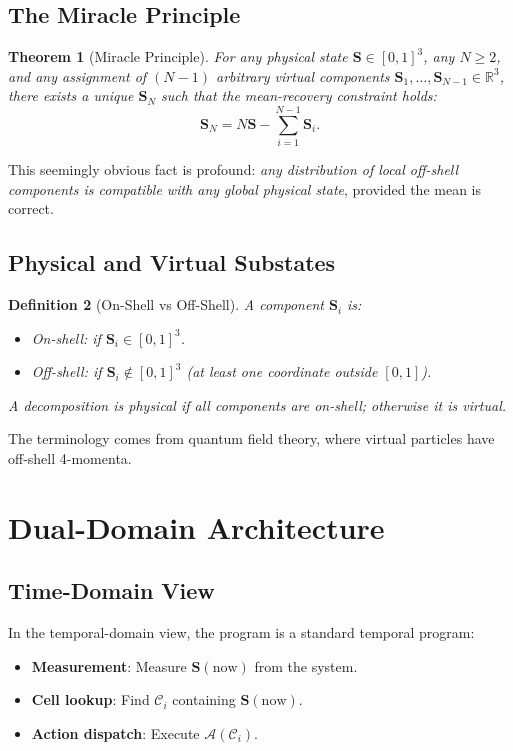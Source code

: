 \documentclass[twocolumn,11pt,a4paper]{article}
\newtheorem{theorem}{Theorem}[section]
\newtheorem{definition}[theorem]{Definition}
\newcommand{\Stuple}{\mathbf{S}}
\newcommand{\calC}{\mathcal{C}}
\begin{document}
\subsection{The Miracle Principle}

\begin{theorem}[Miracle Principle]
For any physical state $\Stuple \in [0,1]^3$, any $N \geq 2$, and any assignment of $(N-1)$ arbitrary virtual components $\Stuple_1, \ldots, \Stuple_{N-1} \in \mathbb{R}^3$, there exists a unique $\Stuple_N$ such that the mean-recovery constraint holds:
\begin{equation}
  \Stuple_N = N\Stuple - \sum_{i=1}^{N-1} \Stuple_i.
\end{equation}
\end{theorem}

This seemingly obvious fact is profound: \emph{any distribution of local off-shell components is compatible with any global physical state}, provided the mean is correct.

\subsection{Physical and Virtual Substates}

\begin{definition}[On-Shell vs Off-Shell]
A component $\Stuple_i$ is:
\begin{itemize}[nosep,leftmargin=1em]
  \item \emph{On-shell}: if $\Stuple_i \in [0,1]^3$.
  \item \emph{Off-shell}: if $\Stuple_i \notin [0,1]^3$ (at least one coordinate outside $[0,1]$).
\end{itemize}
A decomposition is \emph{physical} if all components are on-shell; otherwise it is \emph{virtual}.
\end{definition}

The terminology comes from quantum field theory, where virtual particles have off-shell 4-momenta.

\section{Dual-Domain Architecture}
\label{sec:dualdom}

\subsection{Time-Domain View}

In the temporal-domain view, the program is a standard temporal program:
\begin{itemize}[nosep,leftmargin=1em]
  \item \textbf{Measurement}: Measure $\Stuple(\text{now})$ from the system.
  \item \textbf{Cell lookup}: Find $\calC_i$ containing $\Stuple(\text{now})$.
  \item \textbf{Action dispatch}: Execute $\mathcal{A}(\calC_i)$.
\end{itemize}
\end{document}
